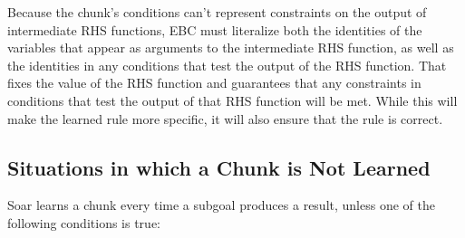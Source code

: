 Because the chunk's conditions can't represent constraints on the output of intermediate RHS functions, EBC must literalize both the identities of the variables that appear as arguments to the intermediate RHS function, as well as the identities in any conditions that test the output of the RHS function.  That fixes the value of the RHS function and guarantees that any constraints in conditions that test the output of that RHS function will be met.  While this will make the learned rule more specific, it will also ensure that the rule is correct.

\subsection{Situations in which a Chunk is Not Learned}

Soar learns a chunk every time a subgoal produces a result, unless one of the following conditions is true:


